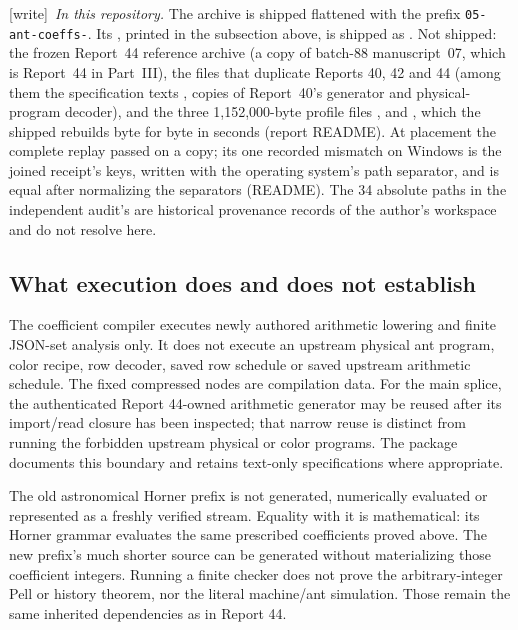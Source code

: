 \documentclass[11pt,letterpaper]{article}
\theoremstyle{definition}\newtheorem{definition}[theorem]{Definition}
\theoremstyle{remark}\newtheorem{remark}[theorem]{Remark}
\newcommand{\wtag}{\textup{[write]}}
\begin{document}
{\small\wtag\ \emph{In this repository.} The archive is shipped flattened
with the prefix \texttt{05-ant-coeffs-}. Its ,
printed in the subsection above, is shipped as
. Not shipped: the frozen
Report~44 reference archive (a copy of batch-88 manuscript~07, which is
Report~44 in Part~III), the files that duplicate Reports 40, 42 and 44
(among them the specification texts , copies
of Report~40's generator and physical-program decoder), and the three
1,152,000-byte profile files ,
 and , which the shipped
 rebuilds byte
for byte in seconds (report README). At placement the complete replay passed
on a copy; its one recorded mismatch on Windows is the joined receipt's
 keys, written with the operating system's path separator, and is
equal after normalizing the separators (README). The 34 absolute
 paths in the independent audit's
 are historical provenance records of the author's
workspace and do not resolve here.\par}

\subsection{What execution does and does not establish}
The coefficient compiler executes newly authored arithmetic lowering and finite JSON-set analysis only. It does not execute an upstream physical ant program, color recipe, row decoder, saved row schedule or saved upstream arithmetic schedule. The fixed compressed nodes are compilation data. For the main splice, the authenticated Report 44-owned arithmetic generator may be reused after its import/read closure has been inspected; that narrow reuse is distinct from running the forbidden upstream physical or color programs. The package documents this boundary and retains text-only specifications where appropriate.

The old astronomical Horner prefix is not generated, numerically evaluated or represented as a freshly verified stream. Equality with it is mathematical: its Horner grammar evaluates the same prescribed coefficients proved above. The new prefix's much shorter source can be generated without materializing those coefficient integers. Running a finite checker does not prove the arbitrary-integer Pell or history theorem, nor the literal machine/ant simulation. Those remain the same inherited dependencies as in Report 44.
\end{document}
